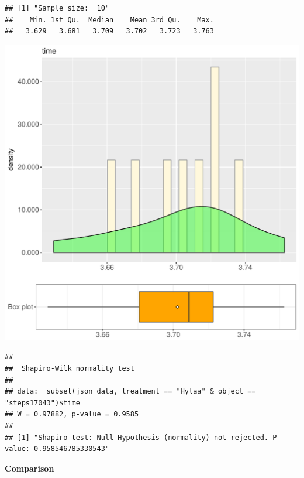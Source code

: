 \documentclass{article}\usepackage[]{graphicx}\usepackage[]{color}
\makeatletter
\def\maxwidth{ %
  \ifdim\Gin@nat@width>\linewidth
    \linewidth
  \else
    \Gin@nat@width
  \fi
}
\newenvironment{kframe}{%
 \def\at@end@of@kframe{}%
 \ifinner\ifhmode%
  \def\at@end@of@kframe{\end{minipage}}%
  \begin{minipage}{\columnwidth}%
 \fi\fi%
 \def\FrameCommand##1{\hskip\@totalleftmargin \hskip-\fboxsep
 \colorbox{shadecolor}{##1}\hskip-\fboxsep
     \hskip-\linewidth \hskip-\@totalleftmargin \hskip\columnwidth}%
 \MakeFramed {\advance\hsize-\width
   \@totalleftmargin\z@ \linewidth\hsize
   \@setminipage}}%
 {\par\unskip\endMakeFramed%
 \at@end@of@kframe}
\newenvironment{knitrout}{}{} %
\makeatother
\begin{document}
\begin{knitrout}
\color{fgcolor}\begin{kframe}
\begin{verbatim}
## [1] "Sample size:  10"
##    Min. 1st Qu.  Median    Mean 3rd Qu.    Max. 
##   3.629   3.681   3.709   3.702   3.723   3.763
\end{verbatim}
\end{kframe}
\includegraphics[width=\maxwidth]{figure/RH2_Hylaa_steps17043-1} 
\begin{kframe}\begin{verbatim}
## 
## 	Shapiro-Wilk normality test
## 
## data:  subset(json_data, treatment == "Hylaa" & object == "steps17043")$time
## W = 0.97882, p-value = 0.9585
## 
## [1] "Shapiro test: Null Hypothesis (normality) not rejected. P-value: 0.958546785330543"
\end{verbatim}
\end{kframe}
\end{knitrout}
  
 \textbf{Comparison}
  
\end{document}
